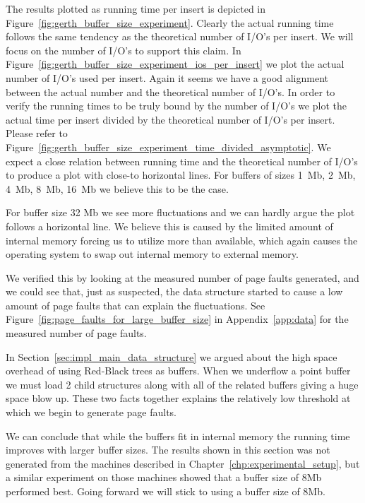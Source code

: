 \documentclass[twoside,11pt,openright]{report}
\begin{document}
The results plotted as running time per insert is depicted in Figure~\ref{fig:gerth_buffer_size_experiment}. Clearly the actual running time follows the same tendency as the theoretical number of I/O's per insert. We will focus on the number of I/O's to support this claim. In Figure~\ref{fig:gerth_buffer_size_experiment_ios_per_insert} we plot the actual number of I/O's used per insert. Again it seems we have a good alignment between the actual number and the theoretical number of I/O's. In order to verify the running times to be truly bound by the number of I/O's we plot the actual time per insert divided by the theoretical number of I/O's per insert. Please refer to Figure~\ref{fig:gerth_buffer_size_experiment_time_divided_asymptotic}. We expect a close relation between running time and the theoretical number of I/O's to produce a plot with close-to horizontal lines. For buffers of sizes 1~Mb, 2~Mb, 4~Mb, 8~Mb, 16~Mb we believe this to be the case. 

For buffer size 32 Mb we see more fluctuations and we can hardly argue the plot follows a horizontal line. We believe this is caused by the limited amount of internal memory forcing us to utilize more than available, which again causes the operating system to swap out internal memory to external memory. 

We verified this by looking at the measured number of page faults generated, and we could see that, just as suspected, the data structure started to cause a low amount of page faults that can explain the fluctuations. See Figure~\ref{fig:page_faults_for_large_buffer_size} in Appendix~\ref{app:data} for the measured number of page faults.

In Section~\ref{sec:impl_main_data_structure} we argued about the high space overhead of using Red-Black trees as buffers. When we underflow a point buffer we must load 2 child structures along with all of the related buffers giving a huge space blow up. These two facts together explains the relatively low threshold at which we begin to generate page faults.

We can conclude that while the buffers fit in internal memory the running time improves with larger buffer sizes. The results shown in this section was not generated from the machines described in Chapter~\ref{chp:experimental_setup}, but a similar experiment on those machines showed that a buffer size of 8Mb performed best. Going forward we will stick to using a buffer size of 8Mb.
\end{document}
